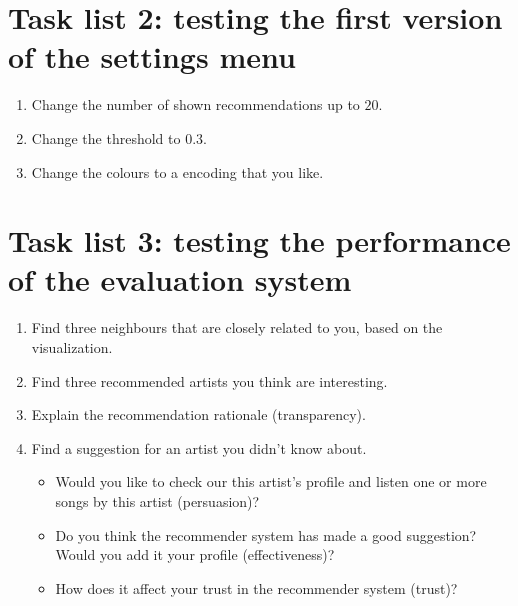 \section{Task list 2: testing the first version of the settings menu}\label{appendix:tasklists:prototype2}

\begin{enumerate}
	\item Change the number of shown recommendations up to $20$.
	\item Change the threshold to $0.3$.
	\item Change the colours to a encoding that you like.
\end{enumerate}


\section{Task list 3: testing the performance of the evaluation system}\label{appendix:tasklists:prototype3}

\begin{enumerate}
	\item Find three neighbours that are closely related to you, based on the visualization.
	\item Find three recommended artists you think are interesting.
	\item Explain the recommendation rationale (transparency).
	\item Find a suggestion for an artist you didn't know about.
		\begin{itemize}
			\item Would you like to check our this artist's profile and listen one or more songs by this artist (persuasion)?
			\item Do you think the recommender system has made a good suggestion? Would you add it your profile (effectiveness)?
			\item How does it affect your trust in the recommender system (trust)?
		\end{itemize}
\end{enumerate}




